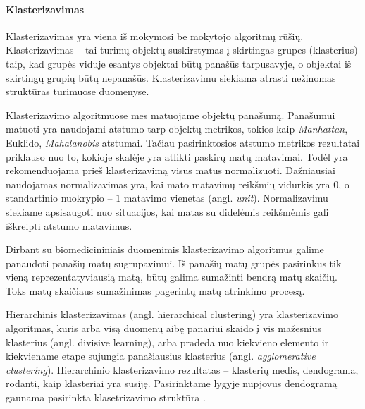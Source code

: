 

\paragraph{Klasterizavimas}

Klasterizavimas yra viena iš mokymosi be mokytojo algoritmų rūšių. Klasterizavimas -- tai turimų objektų suskirstymas į skirtingas grupes (klasterius) taip, kad grupės viduje esantys objektai būtų panašūs tarpusavyje, o objektai iš skirtingų grupių būtų nepanašūs. Klasterizavimu siekiama atrasti nežinomas struktūras turimuose duomenyse. 

Klasterizavimo algoritmuose mes matuojame objektų panašumą. Panašumui matuoti yra naudojami atstumo tarp objektų metrikos, tokios kaip \textit{Manhattan}, Euklido, \textit{Mahalanobis} atstumai. Tačiau pasirinktosios atstumo metrikos rezultatai priklauso nuo to, kokioje skalėje yra atlikti paskirų matų matavimai. Todėl yra rekomenduojama prieš klasterizavimą visus matus normalizuoti. Dažniausiai naudojamas normalizavimas yra, kai mato matavimų reikšmių vidurkis yra $0$, o standartinio nuokrypio -- $1$ matavimo vienetas (angl. \textit{unit}). Normalizavimu siekiame apsisaugoti nuo situacijos, kai matas su didelėmis reikšmėmis gali iškreipti atstumo matavimus. 

Dirbant su biomedicininiais duomenimis klasterizavimo algoritmus galime panaudoti panašių matų sugrupavimui. Iš panašių matų grupės pasirinkus tik vieną reprezentatyviausią matą, būtų galima sumažinti bendrą matų skaičių. Toks matų skaičiaus sumažinimas pagerintų matų atrinkimo procesą.


Hierarchinis klasterizavimas (angl. hierarchical clustering) yra klasterizavimo algoritmas, kuris arba visą duomenų aibę panariui skaido į vis mažesnius klasterius (angl. divisive learning), arba pradeda nuo kiekvieno elemento ir kiekviename etape sujungia panašiausius klasterius (angl. \textit{agglomerative clustering}).  Hierarchinio klasterizavimo rezultatas -- klasterių medis, dendograma, rodanti, kaip klasteriai yra susiję. Pasirinktame lygyje nupjovus dendogramą gaunama pasirinkta klasetrizavimo struktūra \cite{martisiute08}. 

